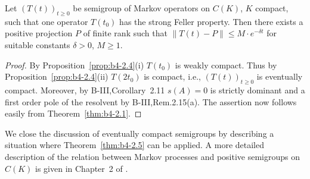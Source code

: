 \begin{theorem}\label{thm:b4-2.5}
	Let $(T(t))_{t \geq 0}$ be semigroup of Markov operators on
	$C(K)$, $K$ compact, such that one operator $T(t_{0})$ has the strong Feller
	property.
	Then there exists a positive projection $P$ of finite rank
	such that $\|T(t) - P\| \leq M\cdot e^{-\delta t}$ for suitable constants $\delta>0$, $M \geq 1$.
\end{theorem}

\begin{proof}
	By Proposition~\ref{prop:b4-2.4}(i) $T(t_{0})$ is weakly compact.
	Thus by Proposition~\ref{prop:b4-2.4}(ii)
	$T(2t_{0})$ is compact, i.e., $(T(t))_{t \geq 0}$ is eventually compact.
	Moreover,
	by B-III,Corollary~2.11 $s(A) = 0$ is strictly dominant and a first order
	pole of the resolvent by B-III,Rem.2.15(a).
	The assertion now follows
	easily from Theorem~\ref{thm:b4-2.1}.
\end{proof}

We close the discussion of eventually compact semigroups by describing
a situation where Theorem~\ref{thm:b4-2.5} can be applied.
A more detailed description
of the relation between Markov processes and positive semigroups on
$C(K)$ is given in Chapter~2 of \citet{vancasteren:1985}.

